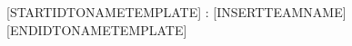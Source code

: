 [STARTIDTONAMETEMPLATE]
\RevealIdentityFormat{[INSERTTEAMID]}: {[INSERTTEAMNAME]}
[ENDIDTONAMETEMPLATE]
